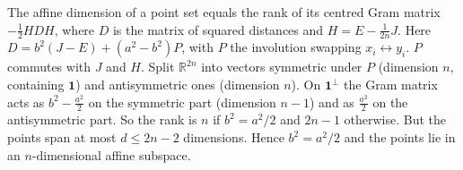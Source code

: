 \documentclass[11pt,a4paper]{article}
\begin{document}
The affine dimension of a point set equals the rank of its centred Gram matrix \(-\frac12HDH\), where \(D\) is the matrix of squared distances and \(H=E-\frac1{2n}J\). Here \(D=b^2(J-E)+(a^2-b^2)P\), with \(P\) the involution swapping \(x_i\leftrightarrow y_i\).
\(P\) commutes with \(J\) and \(H\). Split \(\mathbb R^{2n}\) into vectors symmetric under \(P\) (dimension \(n\), containing \(\mathbf 1\)) and antisymmetric ones (dimension \(n\)). On \(\mathbf 1^\perp\) the Gram matrix acts as \(b^2-\frac{a^2}{2}\) on the symmetric part (dimension \(n-1\)) and as \(\frac{a^2}{2}\) on the antisymmetric part.
So the rank is \(n\) if \(b^2=a^2/2\) and \(2n-1\) otherwise. But the points span at most \(d\le2n-2\) dimensions. Hence \(b^2=a^2/2\) and the points lie in an \(n\)-dimensional affine subspace.
\end{document}
